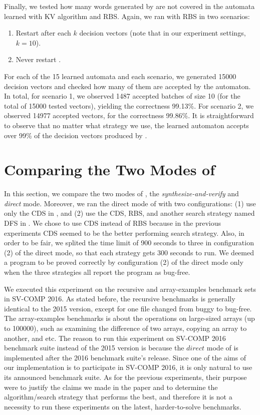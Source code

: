 Finally, we tested how many words generated by \CREST are not covered in the automata learned with KV algorithm and RBS. Again, we ran \CREST with RBS in two scenarios: 
\begin{enumerate}
	\item Restart \CREST after each $k$ decision vectors (note that in our experiment settings, $k = 10$).
	\item Never restart \CREST.
\end{enumerate}
For each of the 15 learned automata and each scenario, we generated 15000 decision vectors and checked how many of them are accepted by the automaton. In total, for scenario 1, we observed 1487 accepted batches of size 10 (for the total of 15000 tested vectors), yielding the correctness 99.13\%. For scenario 2, we observed 14977 accepted vectors, for the correctness 99.86\%. It is straightforward to observe that no matter what strategy we use, the learned automaton accepts over 99\% of the decision vectors produced by \CREST. 

\section{Comparing the Two Modes of \PACMAN}\label{sec:compare_learning_sampling}

In this section, we compare the two modes of \PACMAN, the \emph{synthesize-and-verify} and \emph{direct} mode. Moreover, we ran the direct mode of \PACMAN with two configurations: (1) use only the CDS in \CREST, and (2) use the CDS, RBS, and another search strategy named DFS in \CREST. We chose to use CDS instead of RBS because in the previous experiments CDS seemed to be the better performing search strategy. Also, in order to be fair, we splited the time limit of 900 seconds to three in configuration (2) of the direct mode, so that each strategy gets 300 seconds to run. We deemed a program to be proved correctly by configuration (2) of the direct mode only when the three strategies all report the program as bug-free. 

We executed this experiment on the recursive and array-examples benchmark sets in SV-COMP 2016. As stated before, the recursive benchmarks is generally identical to the 2015 version, except for one file changed from buggy to bug-free. The array-examples benchmarks is about the operations on large-sized arrays (up to 100000), such as examining the difference of two arrays, copying an array to another, and etc. The reason to run this experiment on SV-COMP 2016 benchmark suite instead of the 2015 version is because the $direct$ mode of \PACMAN is implemented after the 2016 benchmark suite's release. Since one of the aims of our implementation is to participate in SV-COMP 2016, it is only natural to use its announced benchmark suite. As for the previous experiments, their purpose were to justify the claims we made in the paper and to determine the algorithm/search strategy that performs the best, and therefore it is not a necessity to run these experiments on the latest, harder-to-solve benchmarks. 



